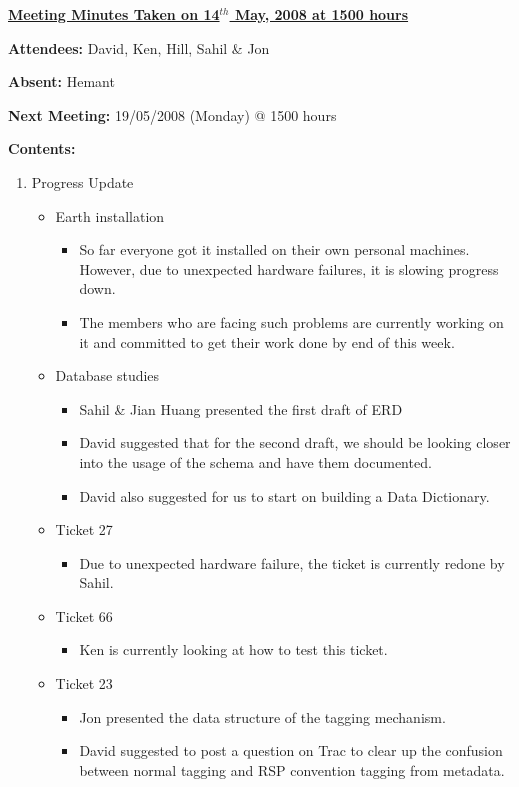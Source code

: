 \documentclass{letter}
\begin{document}
{\large \textbf{\underline{Meeting Minutes Taken on 14$^{th}$ May, 2008 at 1500 hours}}}

\textbf{Attendees:} David, Ken, Hill, Sahil \& Jon 

\textbf{Absent:} Hemant 

\textbf{Next Meeting:} 19/05/2008 (Monday) @ 1500 hours 

\textbf{Contents:}

\begin{enumerate}
	\item Progress Update
		\begin{itemize}
			\item Earth installation
				\begin{itemize}
					\item So far everyone got it installed on their own personal machines. However, due to unexpected hardware failures, it is slowing progress down.
					\item The members who are facing such problems are currently working on it and committed to get their work done by end of this week. 
				\end{itemize}
			\item Database studies
				\begin{itemize}
					\item Sahil \& Jian Huang presented the first draft of ERD
					\item David suggested that for the second draft, we should be looking closer into the usage of the schema and have them documented. 
					\item David also suggested for us to start on building a Data Dictionary. 
				\end{itemize}
			\item Ticket 27
				\begin{itemize}
					\item Due to unexpected hardware failure, the ticket is currently redone by Sahil.
				\end{itemize}
			\item Ticket 66
				\begin{itemize}
					\item Ken is currently looking at how to test this ticket. 
				\end{itemize} 
			\item Ticket 23
				\begin{itemize}
					\item Jon presented the data structure of the tagging mechanism.
					\item David suggested to post a question on Trac to clear up the confusion between normal tagging and RSP convention tagging from metadata.  

\end{itemize}
\end{itemize}
\end{enumerate}
\end{document}
